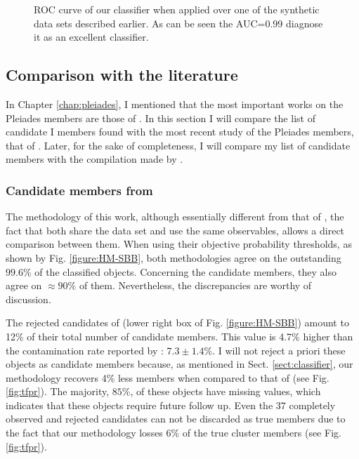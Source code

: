 \begin{figure}[!htp]
\begin{center}
\caption{ROC curve of our classifier when applied over one of the synthetic data sets described earlier. As can be seen the AUC=0.99 diagnose it as an excellent classifier.}
\label{fig:ROC}
\end{center}
\end{figure}

 
\subsection{Comparison with the literature}
In Chapter \ref{chap:pleiades}, I mentioned that the most important works on the Pleiades members are those of \citet{Stauffer2007,Lodieu2012,Sarro2014,Bouy2015}. In this section I will compare the list of candidate I members found with the most recent study of the Pleiades members, that of \citet{Bouy2015}. Later, for the sake of completeness, I will compare my list of candidate members with the compilation made by \citet{Stauffer2007}.  

\subsubsection{Candidate members from \citet{Bouy2015}}
\label{sect:comparisonBouy}
The methodology of this work, although essentially different from that of \citet{Bouy2015}, the fact that both share the data set and use the same observables, allows a direct comparison between them. When using their objective probability thresholds, as shown by Fig. \ref{figure:HM-SBB}, both methodologies agree on the outstanding $99.6$\% of the classified objects. Concerning the candidate members, they also agree on $\approx 90\%$ of them. Nevertheless, the discrepancies are worthy of discussion.

The rejected candidates of \citet{Bouy2015} (lower right box of Fig. \ref{figure:HM-SBB}) amount to 12\% of their total number of candidate members. This value is 4.7\% higher than the contamination rate reported by \citet{Sarro2014}: $7.3\pm1.4$\%. I will not reject a priori these objects as candidate members because, as mentioned in Sect. \ref{sect:classifier}, our methodology recovers 4\% less members when compared to that of \citet{Sarro2014}(see Fig. \ref{fig:tfpr}). The majority, $85\%$, of these objects have missing values, which indicates that these objects require future follow up. Even the 37 completely observed and rejected candidates can not be discarded as true members due to the fact that our methodology losses 6\% of the true cluster members (see Fig. \ref{fig:tfpr}).  

